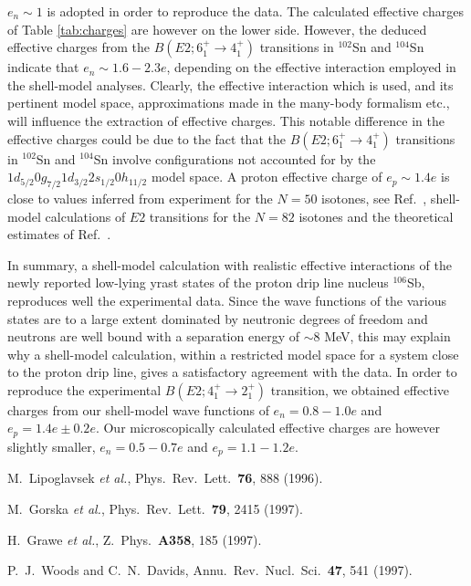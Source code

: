 \begin{multicols}{2}
$e_n\sim 1$ is adopted in order to reproduce the data.  
The calculated effective charges of 
Table \ref{tab:charges} are however on the lower side.
However, the deduced effective charges from the 
$B(E2;6_1^+\rightarrow 4_1^+)$ transitions in $^{102}$Sn \cite{matej} and $^{104}$Sn
\cite{hubert95} indicate that $e_n\sim 1.6-2.3e$, depending
on the effective interaction employed in the shell-model analyses. Clearly, the effective
interaction which is used, and its pertinent model space, approximations
made in the many-body formalism etc., will influence the extraction of effective charges.
This notable difference in the effective charges could be due to the fact that
the  $B(E2;6_1^+\rightarrow 4_1^+)$ transitions in $^{102}$Sn and $^{104}$Sn
involve configurations not accounted for by the 
$1d_{5/2}0g_{7/2}1d_{3/2}2s_{1/2}0h_{11/2}$ model space.
A proton effective charge of $e_p\sim 1.4e$ is close to values inferred
from experiment for the $N=50$ isotones, see Ref.\ \cite{sn100a,sn100b}, shell-model
calculations of $E2$ transitions for the $N=82$ isotones \cite{hehos97} and
the theoretical estimates of Ref.\ \cite{ssbw87}.

In summary, a shell-model calculation with realistic effective
interactions of the newly reported low-lying
yrast states of  the proton drip line nucleus $^{106}$Sb, reproduces well
the experimental data. Since the wave functions of the various states are to a large
extent dominated by neutronic degrees of freedom and neutrons are well
bound with a separation energy of $\sim 8$ MeV, this may explain why a shell-model
calculation, within a restricted model space for a system close to the proton drip line,
gives a satisfactory agreement with the data.  
In order to reproduce the experimental 
$B(E2;4_1^+\rightarrow 2_1^+)$ transition, we obtained 
effective charges from our shell-model wave functions of 
$e_n=0.8-1.0e$ and $e_p=1.4e\pm 0.2e$. 
Our microscopically calculated effective charges are however slightly smaller,
$e_n=0.5-0.7e$ and $e_p=1.1-1.2e$.

\begin{references}

 M.\ Lipoglavsek {\em et al.}, Phys.\ Rev.\ Lett.\ {\bf 76}, 888 (1996).

 M.\ Gorska {\em et al.}, Phys.\ Rev.\ Lett.\ {\bf 79}, 2415 (1997).

 H.\ Grawe {\em et al.}, Z.\ Phys.\ {\bf A358}, 185 (1997).

 P.~J.~Woods and C.~N.~Davids, 
                         Annu.~Rev.~Nucl.~Sci.~{\bf 47}, 541 (1997).


\end{references}
\end{multicols}
